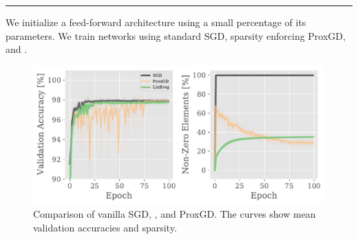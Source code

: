 \newlength\bottomstripheight%
\setlength{\bottomstripheight}{.25\textheight}%
%
\begin{minipage}[t]{\textwidth}%
\vskip0pt%
\textcolor{BaseColor}{%
\rule{\textwidth}{.2mm}%
}\hfill%
%
%
\begin{minipage}[b][\bottomstripheight][b]{.48\textwidth}%
%
%
\small%
We initialize a feed-forward architecture using a small percentage of its parameters. We train networks using standard SGD, sparsity enforcing ProxGD, and \LinBreg{}.
\begin{figure}
\begin{minipage}{.7\textwidth}%
\includegraphics[width=\textwidth, trim= 0cm 0cm 0cm 0cm,clip]{atelier/SGDvsBreg_small.pdf}
\end{minipage}%
\begin{minipage}{.3\textwidth}%
\caption{\small Comparison of vanilla SGD, \LinBreg{}, and ProxGD.
The curves show mean validation accuracies and sparsity.}%
%
\vspace{100pt}


\end{minipage}
\end{figure}
\end{minipage}
\end{minipage}
